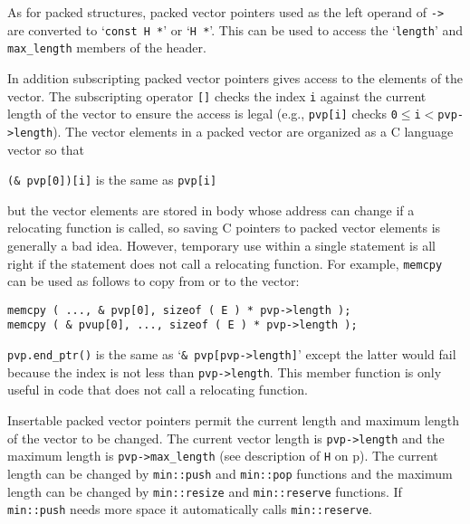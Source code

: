 \documentclass[12pt]{article}
\newcommand{\pagref}[1]{p\pageref{#1}}
\newcommand{\EOL}{\penalty \exhyphenpenalty}
\newenvironment{indpar}[1][0.3in]%
	{\begin{list}{}%
		     {\setlength{\itemsep}{0in}%
		      \setlength{\topsep}{0in}%
		      \setlength{\parsep}{1ex}%
		      \setlength{\labelwidth}{#1}%
		      \setlength{\leftmargin}{#1}%
		      \addtolength{\leftmargin}{\labelsep}}%
	 \item}%
	{\end{list}}
\begin{document}
As for packed structures, packed vector pointers used as the left
operand of \verb|->| are converted to
`\verb|const H *|' or
`\verb|H *|'.  This can be used to access the `\verb|length|'
and \verb|max_length| members of the header.

In addition subscripting packed vector
pointers gives access to the elements of the vector.  The subscripting
operator \verb|[]| checks the index \verb|i| against the current length
of the vector to ensure the access is legal (e.g., \verb|pvp[i]|
checks \verb|0|$\leq$\verb|i|$<$\verb|pvp->length|).
The vector elements in a
packed vector are organized as a C language vector so that
\begin{center}
\verb|(& pvp[0])[i]| is the same as \verb|pvp[i]|
\end{center}
but the vector elements are stored in body whose address can change
if a relocating function is called, so saving C pointers to packed vector
elements is generally a bad idea.  However, temporary use within a single
statement is all right if the statement does not call a relocating
function.  For example, \verb|memcpy| can be used as follows to copy
from or to the vector:
\begin{indpar}\begin{verbatim}
memcpy ( ..., & pvp[0], sizeof ( E ) * pvp->length );
memcpy ( & pvup[0], ..., sizeof ( E ) * pvp->length );
\end{verbatim}\end{indpar}

\verb|pvp.end_ptr()| is the same as `\verb|& pvp[pvp->length]|'
except the latter would fail because the index is not less than
\verb|pvp->length|.  This member function is only useful
in code that does not call a relocating function.

Insertable packed vector pointers permit the current length and maximum
length of the vector to be changed.
The current vector length is \verb|pvp->length| and the maximum
length is \verb|pvp->max_length| (see description of \verb|H| on
\pagref{PACKED_VEC_HEADER_TYPE}).
The current length can be changed by {\tt min::\EOL push} and
{\tt min::\EOL pop} functions and the maximum length can be changed
by {\tt min::\EOL resize} and {\tt min::\EOL reserve} functions.  If
{\tt min::\EOL push} needs more space it automatically calls
{\tt min::reserve}.
\end{document}
